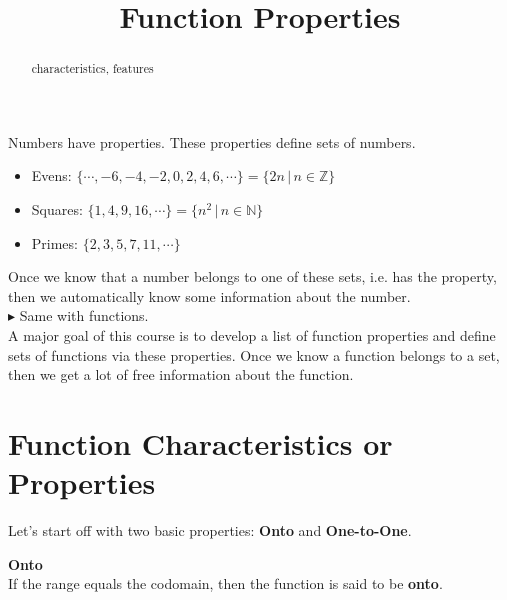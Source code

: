 \documentclass{ximera}
\title{Function Properties}
\begin{document}
\begin{abstract}
characteristics, features
\end{abstract}
\maketitle





Numbers have properties.  These properties define sets of numbers.

\begin{itemize}
\item Evens:  $\{ \cdots, -6, -4, -2, 0, 2, 4, 6, \cdots \} = \{ 2n   \, | \, n \in \mathbb{Z} \}$
\item Squares:  $\{ 1, 4, 9, 16, \cdots \} = \{ n^2   \, | \, n \in \mathbb{N} \}$
\item Primes:  $\{ 2, 3, 5, 7, 11,  \cdots \}$
\end{itemize}

Once we know that a number belongs to one of these sets, i.e. has the property, then we automatically know some information about the number. \\


$\blacktriangleright$ Same with functions. \\



A major goal of this course is to develop a list of function properties and define sets of functions via these properties.  Once we know a function belongs to a set, then we get a lot of free information about the function. \\









\section{Function Characteristics or Properties}


Let's start off with two basic properties: \textbf{Onto} and \textbf{One-to-One}.







\begin{definition} \textbf{\textcolor{green!50!black}{Onto}} \\

If the range equals the codomain, then the function is said to be \textbf{onto}.

\end{definition}
\end{document}
